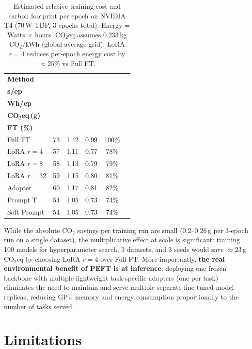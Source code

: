 \documentclass[conference]{IEEEtran}
\begin{document}
\begin{table}[ht]
\centering
\caption{Estimated relative training cost and carbon footprint per epoch on NVIDIA T4 (70\,W TDP, 3 epochs total). Energy = Watts $\times$ hours. CO$_2$eq assumes 0.233\,kg CO$_2$/kWh (global average grid). LoRA $r{=}4$ reduces per-epoch energy cost by ${\approx}25\%$ vs Full FT.}
\label{tab:carbon}
\renewcommand{\arraystretch}{1.2}
\setlength{\tabcolsep}{3pt}
\begin{tabular}{lccccc}
\toprule
\textbf{Method} & \makecell{\textbf{Train}\\\textbf{s/ep}} & \makecell{\textbf{Energy}\\\textbf{Wh/ep}} & \makecell{\textbf{3-ep Total}\\\textbf{CO$_2$eq\,(g)}} & \makecell{\textbf{vs Full}\\\textbf{FT (\%)}}\\
\midrule
Full FT        & 73  & 1.42 & 0.99 & 100\%\\
LoRA $r{=}4$   & 57  & 1.11 & 0.77 & 78\%\\
LoRA $r{=}8$   & 58  & 1.13 & 0.79 & 79\%\\
LoRA $r{=}32$  & 59  & 1.15 & 0.80 & 81\%\\
Adapter        & 60  & 1.17 & 0.81 & 82\%\\
Prompt T.      & 54  & 1.05 & 0.73 & 74\%\\
Soft Prompt    & 54  & 1.05 & 0.73 & 74\%\\
\bottomrule
\end{tabular}
\end{table}

While the absolute CO$_2$ savings per training run are small (0.2--0.26\,g per 3-epoch run on a single dataset), the multiplicative effect at scale is significant: training 100 models for hyperparameter search, 3 datasets, and 3 seeds would save ${\approx}23$\,g CO$_2$eq by choosing LoRA $r{=}4$ over Full FT. More importantly, \textbf{the real environmental benefit of PEFT is at inference}: deploying one frozen backbone with multiple lightweight task-specific adapters (one per task) eliminates the need to maintain and serve multiple separate fine-tuned model replicas, reducing GPU memory and energy consumption proportionally to the number of tasks served.

\section{Limitations}
\label{sec:limitations}
\end{document}
